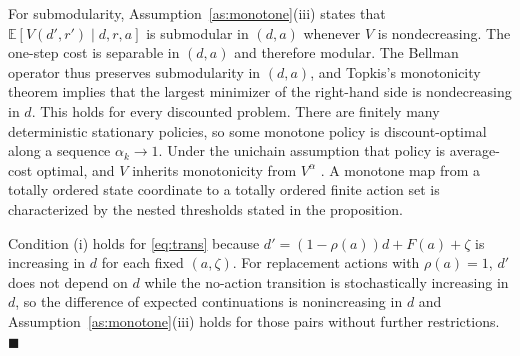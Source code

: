 \documentclass[journal]{IEEEtran}
\newcommand{\E}{\mathbb{E}}
\begin{document}
For submodularity, Assumption~\ref{as:monotone}(iii) states that $\E[V(d',r')\mid d,r,a]$ is submodular in $(d,a)$ whenever $V$ is nondecreasing. The one-step cost is separable in $(d,a)$ and therefore modular. The Bellman operator thus preserves submodularity in $(d,a)$, and Topkis's monotonicity theorem implies that the largest minimizer of the right-hand side is nondecreasing in $d$. This holds for every discounted problem. There are finitely many deterministic stationary policies, so some monotone policy is discount-optimal along a sequence $\alpha_k\to1$. Under the unichain assumption that policy is average-cost optimal, and $V$ inherits monotonicity from $V^{\alpha}$ \cite[Ch.~8]{puterman1994}. A monotone map from a totally ordered state coordinate to a totally ordered finite action set is characterized by the nested thresholds stated in the proposition.

Condition (i) holds for \eqref{eq:trans} because $d'=(1-\rho(a))d+F(a)+\zeta$ is increasing in $d$ for each fixed $(a,\zeta)$. For replacement actions with $\rho(a)=1$, $d'$ does not depend on $d$ while the no-action transition is stochastically increasing in $d$, so the difference of expected continuations is nonincreasing in $d$ and Assumption~\ref{as:monotone}(iii) holds for those pairs without further restrictions. \hfill$\blacksquare$
\end{document}
